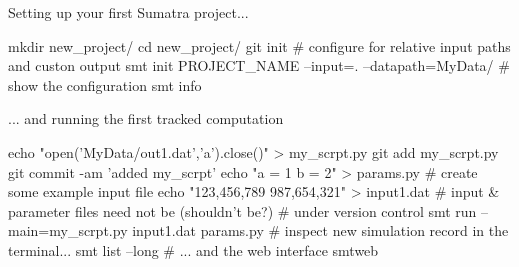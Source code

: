 \begin{frame}[fragile]{Setting up your first Sumatra project...}

  \vspace{0.2cm}
  \begin{mlineshell}
    mkdir new_project/
    cd new_project/
    git init
    # configure for relative input paths and custon output
    smt init PROJECT_NAME --input=. --datapath=MyData/
    # show the configuration
smt info
  \end{mlineshell}
\end{frame}

\begin{frame}[fragile]{... and running the first tracked computation}

  \begin{mlineshell}
    echo "open('MyData/out1.dat','a').close()" > my_scrpt.py
    git add my_scrpt.py
    git commit -am 'added my_scrpt'
    echo "a = 1
          b = 2" > params.py 
    # create some example input file
    echo "123,456,789
          987,654,321" > input1.dat
    # input & parameter files need not be (shouldn't be?) 
    # under version control
    smt run --main=my_scrpt.py input1.dat params.py
    # inspect new simulation record in the terminal...
    smt list --long
    # ... and the web interface
    smtweb
  \end{mlineshell}

\end{frame}





